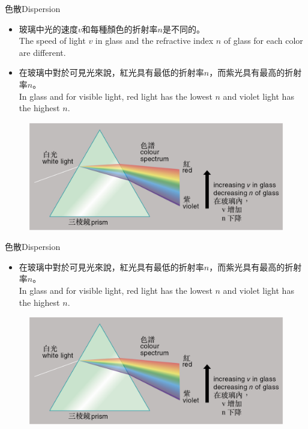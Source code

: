\documentclass[beamer=true]{standalone}
\begin{document}
\begin{frame}{色散Dispersion}
    \begin{itemize}
        \item 玻璃中光的速度$v$和每種顏色的折射率$n$是不同的。\\The speed of light $v$ in glass and the refractive index $n$ of glass for each color are different.
        \item 在玻璃中對於可見光來說，紅光具有最低的折射率$n$，而紫光具有最高的折射率$n$。\\In glass and for visible light, red light has the lowest $n$ and violet light has the highest $n$.
    \end{itemize}
    \begin{figure}
        \centering
        \includegraphics[width=0.75\linewidth]{assets/ddqwdqwdwq1111ge.png}
        
        
    \end{figure}
\end{frame}
\begin{frame}{色散Dispersion}
    \begin{itemize}
        \item 在玻璃中對於可見光來說，紅光具有最低的折射率$n$，而紫光具有最高的折射率$n$。\\In glass and for visible light, red light has the lowest $n$ and violet light has the highest $n$.
        
    \end{itemize}
    \begin{figure}
        \centering
        \includegraphics[width=0.75\linewidth]{assets/ddqwdqwdwq1111ge.png}
        
        
    \end{figure}
\end{frame}
\end{document}
